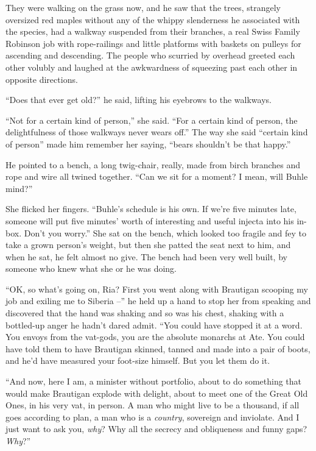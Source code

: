 They were walking on the grass now, and he saw that the trees, 
strangely oversized red maples without any of the whippy slenderness he 
associated with the species, had a walkway suspended from their 
branches, a real Swiss Family Robinson job with rope-railings and 
little platforms with baskets on pulleys for ascending and descending. 
The people who scurried by overhead greeted each other volubly and 
laughed at the awkwardness of squeezing past each other in opposite 
directions.

“Does that ever get old?” he said, lifting his eyebrows to the 
walkways.

“Not for a certain kind of person,” she said. “For a certain kind 
of person, the delightfulness of those walkways never wears off.” The 
way she said “certain kind of person” made him remember her saying, 
“bears shouldn't be that happy.”

He pointed to a bench, a long twig-chair, really, made from birch 
branches and rope and wire all twined together. “Can we sit for a 
moment? I mean, will Buhle mind?”

She flicked her fingers. “Buhle's schedule is his own. If we're five 
minutes late, someone will put five minutes' worth of interesting and 
useful injecta into his in-box. Don't you worry.” She sat on the 
bench, which looked too fragile and fey to take a grown person's 
weight, but then she patted the seat next to him, and when he sat, he 
felt almost no give. The bench had been very well built, by someone who 
knew what she or he was doing.

“OK, so what's going on, Ria? First you went along with Brautigan 
scooping my job and exiling me to Siberia --” he held up a hand to 
stop her from speaking and discovered that the hand was shaking and so 
was his chest, shaking with a bottled-up anger he hadn't dared admit. 
“You could have stopped it at a word. You envoys from the vat-gods, 
you are the absolute monarchs at Ate. You could have told them to have 
Brautigan skinned, tanned and made into a pair of boots, and he'd have 
measured your foot-size himself. But you let them do it.

“And now, here I am, a minister without portfolio, about to do 
something that would make Brautigan explode with delight, about to meet 
one of the Great Old Ones, in his very vat, in person. A man who might 
live to be a thousand, if all goes according to plan, a man who is a 
\emph{country}, sovereign and inviolate. And I just want to ask you, 
\emph{why}? Why all the secrecy and obliqueness and funny gaps? 
\emph{Why}?”

